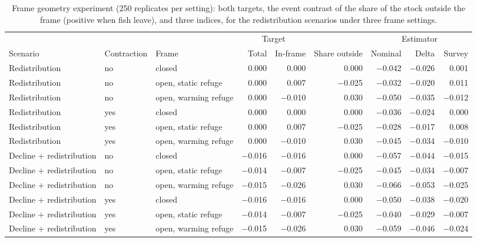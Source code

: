\documentclass[11pt,a4paper]{article}
\begin{document}
\begin{table}[htbp]
\centering\scriptsize
\setlength{\tabcolsep}{3.5pt}
\caption{Frame geometry experiment (250 replicates per setting): both targets, the event contrast of the share of the stock outside the frame (positive when fish leave), and three indices, for the redistribution scenarios under three frame settings.}
\label{tab:frame}
\begin{tabular}{@{}>{\raggedright\arraybackslash}p{2.9cm}ll rrrrrr@{}}
\toprule
 & & & \multicolumn{2}{c}{Target} & & \multicolumn{3}{c}{Estimator} \\
\cmidrule(lr){4-5}\cmidrule(l){7-9}
Scenario & Contraction & Frame & Total & In-frame & Share outside & Nominal & Delta & Survey \\
\midrule
Redistribution & no & closed & 0.000 & 0.000 & 0.000 & $-$0.042 & $-$0.026 & 0.001 \\
Redistribution & no & open, static refuge & 0.000 & 0.007 & $-$0.025 & $-$0.032 & $-$0.020 & 0.011 \\
Redistribution & no & open, warming refuge & 0.000 & $-$0.010 & 0.030 & $-$0.050 & $-$0.035 & $-$0.012 \\
Redistribution & yes & closed & 0.000 & 0.000 & 0.000 & $-$0.036 & $-$0.024 & 0.000 \\
Redistribution & yes & open, static refuge & 0.000 & 0.007 & $-$0.025 & $-$0.028 & $-$0.017 & 0.008 \\
Redistribution & yes & open, warming refuge & 0.000 & $-$0.010 & 0.030 & $-$0.045 & $-$0.034 & $-$0.010 \\
Decline + redistribution & no & closed & $-$0.016 & $-$0.016 & 0.000 & $-$0.057 & $-$0.044 & $-$0.015 \\
Decline + redistribution & no & open, static refuge & $-$0.014 & $-$0.007 & $-$0.025 & $-$0.045 & $-$0.034 & $-$0.007 \\
Decline + redistribution & no & open, warming refuge & $-$0.015 & $-$0.026 & 0.030 & $-$0.066 & $-$0.053 & $-$0.025 \\
Decline + redistribution & yes & closed & $-$0.016 & $-$0.016 & 0.000 & $-$0.050 & $-$0.038 & $-$0.020 \\
Decline + redistribution & yes & open, static refuge & $-$0.014 & $-$0.007 & $-$0.025 & $-$0.040 & $-$0.029 & $-$0.007 \\
Decline + redistribution & yes & open, warming refuge & $-$0.015 & $-$0.026 & 0.030 & $-$0.059 & $-$0.046 & $-$0.024 \\
\bottomrule
\end{tabular}
\end{table}
\end{document}
